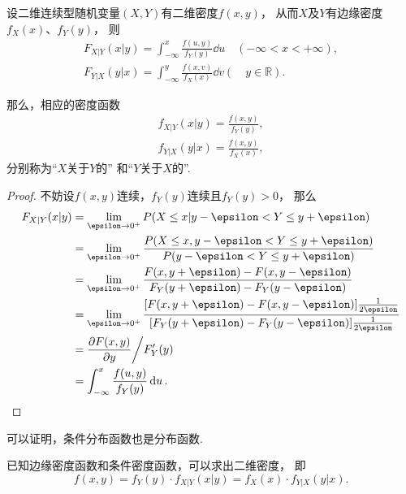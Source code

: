 \begin{theorem}
设二维连续型随机变量\((X,Y)\)有二维密度\(f(x,y)\)，
从而\(X\)及\(Y\)有边缘密度\(f_X(x)\)、\(f_Y(y)\)，
则\begin{gather*}
	F_{X \vert Y}(x \vert y)
	= \int_{-\infty}^x \frac{f(u,y)}{f_Y(y)}\dd{u}
	\quad(-\infty < x < +\infty), \\
	F_{Y \vert X}(y \vert x)
	= \int_{-\infty}^y \frac{f(x,v)}{f_X(x)}\dd{v}
	(\quad y \in \mathbb{R}).
\end{gather*}

那么，相应的密度函数\begin{gather}
	f_{X \vert Y}(x \vert y)
	= \frac{f(x,y)}{f_Y(y)},
		\label{equation:多维随机变量及其分布.条件密度、联合密度、边缘密度的关系1} \\
	f_{Y \vert X}(y \vert x)
	= \frac{f(x,y)}{f_X(x)},
		\label{equation:多维随机变量及其分布.条件密度、联合密度、边缘密度的关系2}
\end{gather}
分别称为“\(X\)关于\(Y\)的”%
和“\(Y\)关于\(X\)的”.
\begin{proof}
不妨设\(f(x,y)\)连续，\(f_Y(y)\)连续且\(f_Y(y)>0\)，
\def\l{\lim_{\epsilon\to0^+}}%
那么\begin{align*}
	F_{X \vert Y}(x \vert y)
	&= \lim_{\epsilon\to0^+}
		P(X \leq x \vert y - \epsilon < Y \leq y + \epsilon) \\
	&= \lim_{\epsilon\to0^+}
		\frac{
			P(X \leq x, y - \epsilon < Y \leq y + \epsilon)
		}{
			P(y - \epsilon < Y \leq y + \epsilon)
		} \\
	&= \lim_{\epsilon\to0^+}
		\frac{
			F(x,y+\epsilon) - F(x,y-\epsilon)
		}{
			F_Y(y+\epsilon) - F_Y(y-\epsilon)
		} \\
	&= \lim_{\epsilon\to0^+}
		\frac{
			[F(x,y+\epsilon) - F(x,y-\epsilon)] \frac{1}{2 \epsilon}
		}{
			[F_Y(y+\epsilon) - F_Y(y-\epsilon)] \frac{1}{2 \epsilon}
		} \\
	&= \pdv{F(x,y)}{y} \bigg/ F_Y'(y) \\
	&= \int_{-\infty}^x \frac{f(u,y)}{f_Y(y)} \dd{u}.
	\qedhere
\end{align*}
\end{proof}
\end{theorem}

可以证明，条件分布函数也是分布函数.

\begin{corollary}
已知边缘密度函数和条件密度函数，可以求出二维密度，
即\begin{equation*}
	f(x,y) = f_Y(y) \cdot f_{X \vert Y}(x \vert y)
	= f_X(x) \cdot f_{Y \vert X}(y \vert x).
\end{equation*}
\end{corollary}

